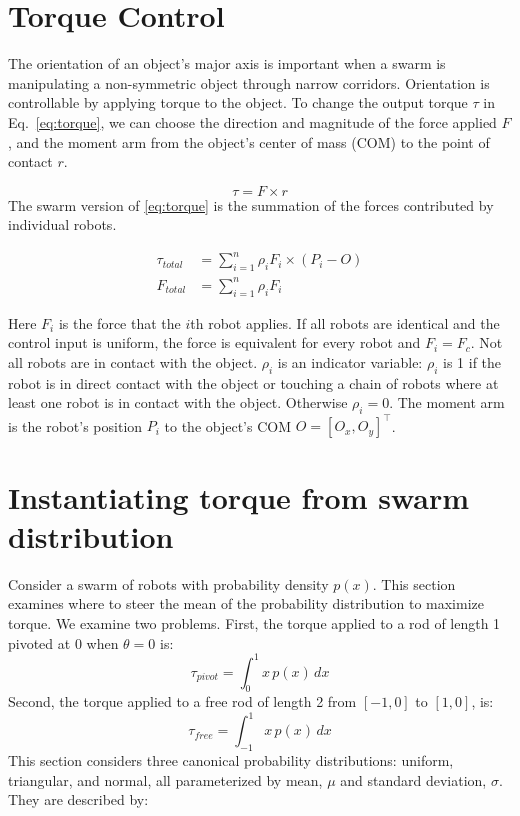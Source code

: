 \section{Torque Control}
\label{sec:theory}


The orientation of an object's major axis is important when a swarm is manipulating a non-symmetric object through narrow corridors. 
Orientation is controllable by applying torque to the object. 
To change the output torque $\tau$ in Eq.~\eqref{eq:torque}, we can choose the direction and magnitude of the force applied $F$, and the moment arm from the object's center of mass (COM) to the point of contact $r$.

\begin{equation}
\tau = F \times r\label{eq:torque}
\end{equation}
The swarm version of \eqref{eq:torque} is the summation of the forces contributed by individual robots.

\begin{align}
\tau_{total} &= \sum\limits_{i=1}^n \rho_i F_i \times (P_i - O )   \label{eq:swarmtorque}\\
F_{total} &= \sum\limits_{i=1}^n \rho_i F_i  \label{eq:swarmforce}
\end{align}

Here $F_i$ is the force that the $i$th robot applies.  If all robots are identical and the control input is uniform, the force is equivalent for every robot and $F_i = F_c$.
Not all robots are in contact with the object.  $\rho_i$ is an indicator variable: $\rho_i$ is 1 if the robot is in direct contact with the object or touching a chain of robots where at least one robot is in contact with the object. Otherwise $\rho_i = 0$.
The moment arm is the robot's position $P_i$ to the object's COM $O=[O_x,O_y]^{\top}$.

\section{Instantiating torque from swarm distribution}
Consider a swarm of robots with probability density $p(x)$. This section examines where to steer the mean of the probability distribution to maximize torque. We examine two problems. First, the torque applied to a rod of length 1 pivoted at 0 when $\theta = 0$ is:
\begin{equation}
\tau_{pivot} = \int_0^1 x\,p(x)\, dx
\end{equation}
Second, the torque applied to a free rod of length 2 from $[-1,0]$ to $[1,0]$, is:
\begin{equation}
\tau_{free} = \int_{-1}^1 x\,p(x)\, dx
\end{equation}
This section considers three canonical probability distributions: uniform, triangular, and normal, all parameterized by mean, $\mu$ and standard deviation, $\sigma$. They are described by:

